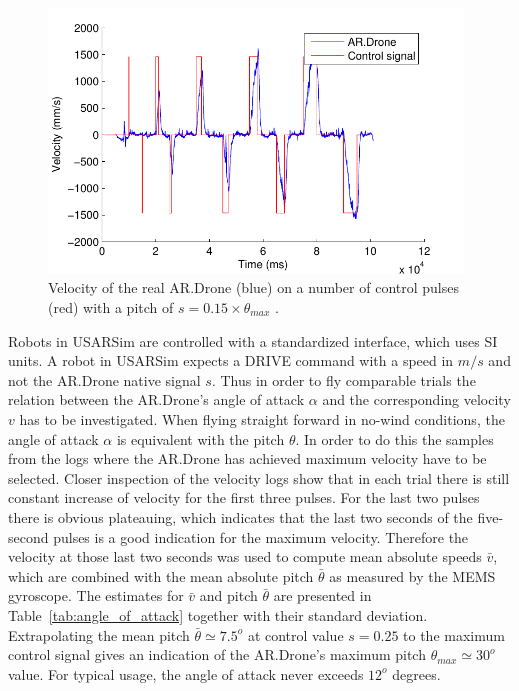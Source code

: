 \begin{figure}[htb]
\centering
\includegraphics[width=11cm]{images/Dr7Ov-eps-converted-to.pdf}
\caption{Velocity of the real AR.Drone (blue) on a number of control pulses (red) with a pitch of $s=0.15 \times \theta_{max}$ .}
\label{fig:RealResponse}
\end{figure}

Robots in USARSim are controlled with a standardized interface, which uses SI units. A robot in USARSim expects a DRIVE command with a speed in $m/s$ and not the AR.Drone native signal $s$. 
Thus in order to 
fly comparable trials 
the relation between the AR.Drone's angle of attack $\alpha$ and the corresponding velocity $v$ has to be investigated.
When flying straight forward in no-wind conditions, the angle of attack $\alpha$ is equivalent with the pitch $\theta$.
In order to do this the samples from the logs where the AR.Drone has achieved maximum
velocity have to be selected. Closer inspection of the velocity logs show that in each trial there is still constant increase of velocity for the first three pulses. For the last two pulses there is obvious plateauing, which indicates that the last two seconds of the five-second pulses is a good indication for the maximum velocity. Therefore the velocity at those
last two seconds was used to compute mean absolute speeds $\bar{v}$, which are combined with the mean absolute
pitch $\bar{\theta}$ as measured by the MEMS gyroscope. The estimates for $\bar{v}$ and pitch $\bar{\theta}$ are presented in Table~\ref{tab:angle_of_attack} together with their standard deviation. 
Extrapolating the mean pitch $\bar{\theta}\simeq7.5^o$ at 
control value $s=0.25$ to the maximum control signal gives an indication of
the AR.Drone's maximum pitch $\theta_{max}\simeq30^o$ value. For typical usage, the angle of attack never exceeds $12^o$ degrees.

